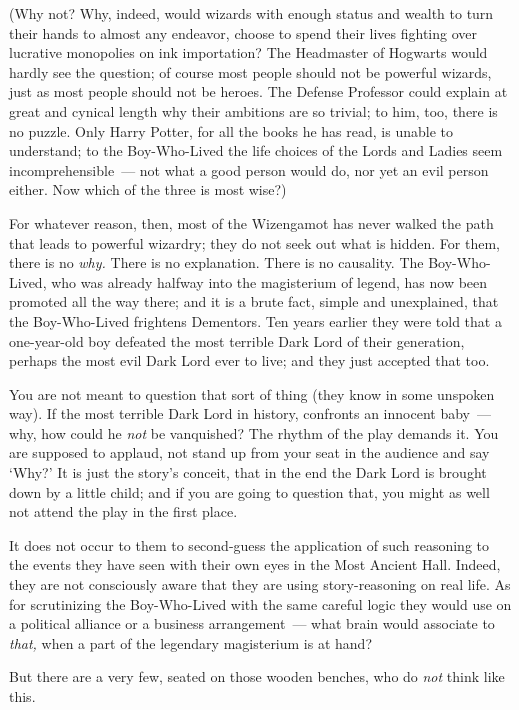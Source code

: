 (Why not? Why, indeed, would wizards with enough status and wealth to turn their hands to almost any endeavor, choose to spend their lives fighting over lucrative monopolies on ink importation? The Headmaster of Hogwarts would hardly see the question; of course most people should not be powerful wizards, just as most people should not be heroes. The Defense Professor could explain at great and cynical length why their ambitions are so trivial; to him, too, there is no puzzle. Only Harry Potter, for all the books he has read, is unable to understand; to the Boy-Who-Lived the life choices of the Lords and Ladies seem incomprehensible~--- not what a good person would do, nor yet an evil person either. Now which of the three is most wise?)

For whatever reason, then, most of the Wizengamot has never walked the path that leads to powerful wizardry; they do not seek out what is hidden. For them, there is no \emph{why.} There is no explanation. There is no causality. The Boy-Who-Lived, who was already halfway into the magisterium of legend, has now been promoted all the way there; and it is a brute fact, simple and unexplained, that the Boy-Who-Lived frightens Dementors. Ten years earlier they were told that a one-year-old boy defeated the most terrible Dark Lord of their generation, perhaps the most evil Dark Lord ever to live; and they just accepted that too.

You are not meant to question that sort of thing (they know in some unspoken way). If the most terrible Dark Lord in history, confronts an innocent baby~--- why, how could he \emph{not} be vanquished? The rhythm of the play demands it. You are supposed to applaud, not stand up from your seat in the audience and say `Why?' It is just the story's conceit, that in the end the Dark Lord is brought down by a little child; and if you are going to question that, you might as well not attend the play in the first place.

It does not occur to them to second-guess the application of such reasoning to the events they have seen with their own eyes in the Most Ancient Hall. Indeed, they are not consciously aware that they are using story-reasoning on real life. As for scrutinizing the Boy-Who-Lived with the same careful logic they would use on a political alliance or a business arrangement~--- what brain would associate to \emph{that,} when a part of the legendary magisterium is at hand?

But there are a very few, seated on those wooden benches, who do \emph{not} think like this.

